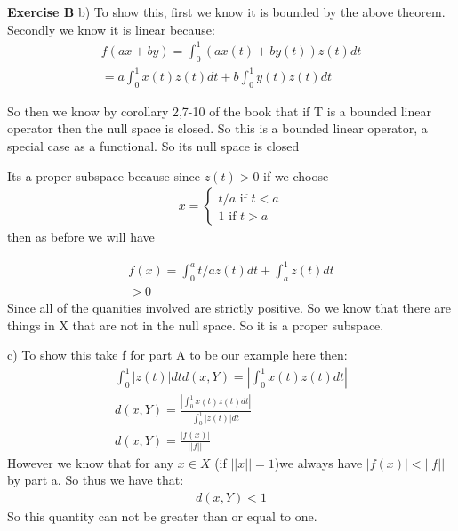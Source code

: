 \documentclass[12pt]{article}
\newenvironment{exercise}[1]{\vspace{.1in}\noindent\textbf{Exercise #1 \hspace{.05em}}}{}
\theoremstyle{definition}
\theoremstyle{remark}
\begin{document}
\begin{exercise}{B}
	b) To show this, first we know it is bounded by the above theorem. Secondly we know it is linear because:
	\begin{align}
		f(ax+by)=\int_0^1(ax(t)+by(t))z(t)dt \\
		=a\int_0^1 x(t)z(t)dt+b\int_0^1 y(t)z(t)dt
	\end{align}

	So then we know by corollary 2,7-10 of the book that if T is a bounded linear operator then the null space is closed. So this is a bounded linear operator, a special case as a functional. So its null space is closed

	Its a proper subspace because since $z(t)>0$ if we choose
	\begin{align}
		x=%
		\begin{cases}
			t/a \text{ if } t<a \\
			1 \text{ if } t>a
		\end{cases}
	\end{align}
	then as before we will have

	\begin{align}
		f(x)=\int_0^at/az(t)dt+\int_a^1z(t)dt \\
		>0
	\end{align}
	Since all of the quanities involved are strictly positive. So we know that there are things in X that are not in the null space. So it is a proper subspace.

	c) To show this take f for part A to be our example here then:
	\begin{align}
		\int_0^1|z(t)|dtd(x,Y)=|\int_0^1x(t)z(t)dt|          \\
		d(x,Y)=\frac{|\int_0^1x(t)z(t)dt|}{\int_0^1|z(t)|dt} \\
		d(x,Y)=\frac{|f(x)|}{||f||}
	\end{align}
	However we know that for any $x\in X$ (if $||x||=1$)we always have $|f(x)|<||f||$ by part a. So thus we have that:
	\begin{align}
		d(x,Y)<1
	\end{align}
	So this quantity can not be greater than or equal to one.
\end{exercise}
\end{document}
